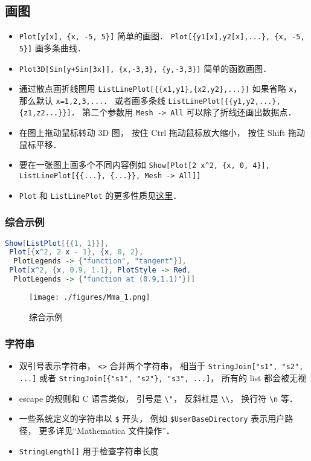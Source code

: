 \subsection{画图}
\begin{itemize}
\item \verb|Plot[y[x], {x, -5, 5}]| 简单的画图． \verb|Plot[{y1[x],y2[x],...}, {x, -5, 5}]| 画多条曲线．
\item \verb|Plot3D[Sin[y+Sin[3x]], {x,-3,3}, {y,-3,3}]| 简单的函数画图．
\item 通过散点画折线图用 \verb|ListLinePlot[{{x1,y1},{x2,y2},...}]| 如果省略 \verb|x|， 那么默认 \verb|x=1,2,3,...|． 或者画多条线 \verb|ListLinePlot[{{y1,y2,...},{z1,z2...}}]|． 第二个参数用 \verb|Mesh -> All| 可以除了折线还画出数据点．
\item 在图上拖动鼠标转动 3D 图， 按住 Ctrl 拖动鼠标放大缩小， 按住 Shift 拖动鼠标平移．
\item 要在一张图上画多个不同内容例如 \verb|Show[Plot[2 x^2, {x, 0, 4}], ListLinePlot[{{...}, {...}}, Mesh -> All]]|
\item \verb|Plot| 和 \verb|ListLinePlot| 的更多性质见\href{https://reference.wolfram.com/language/ref/Plot.html}{这里}．
\end{itemize}

\subsubsection{综合示例}
\begin{lstlisting}[language=Mathematica]
Show[ListPlot[{{1, 1}}],
 Plot[{x^2, 2 x - 1}, {x, 0, 2},
  PlotLegends -> {"function", "tangent"}],
 Plot[x^2, {x, 0.9, 1.1}, PlotStyle -> Red, 
  PlotLegends -> {"function at (0.9,1.1)"}]]
\end{lstlisting}
\begin{figure}[ht]
\centering
\texttt{[image: ./figures/Mma\_1.png]}
\caption{综合示例} \label{Mma_fig1}
\end{figure}

\subsubsection{字符串}
\begin{itemize}
\item 双引号表示字符串， \verb|<>| 合并两个字符串， 相当于 \verb|StringJoin["s1", "s2", ...]| 或者 \verb|StringJoin[{"s1", "s2"}, "s3", ...]|， 所有的 list 都会被无视
\item escape 的规则和 C 语言类似， 引号是 \verb|\"|， 反斜杠是 \verb|\\|， 换行符 \verb|\n| 等．
\item 一些系统定义的字符串以 \verb|$| 开头， 例如 \verb|$UserBaseDirectory| 表示用户路径， 更多详见“Mathematica 文件操作”．
\item \verb|StringLength[]| 用于检查字符串长度
\end{itemize}

